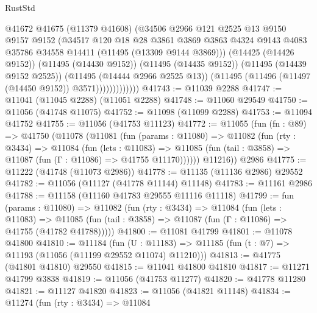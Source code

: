 \begin{lexlean}{RustStd}
\begin{coremodule}
                        @41672
                        @41675
                        (@11379 @41608)
                        (@34506
                          @2966
                          @121
                          @2525
                          @13
                          @9150
                          @9157
                          @9152
                          (@34517
                            @120
                            @18
                            @28
                            @3861
                            @3869
                            @3863
                            @4324
                            @9143
                            @4083
                            @35786
                            @34558
                            @14411
                            (@11495 (@13309 @9144 @3869)))
                          (@14425 (@14426 @9152))
                          (@11495 (@14430 @9152))
                          (@11495 (@14435 @9152))
                          (@11495 (@14439 @9152 @2525))
                          (@11495 (@14444 @2966 @2525 @13))
                          (@11495 (@11496 (@11497 (@14450 @9152)) @3571)))))))))))))
@41743 := @11039 @2288
@41747 := @11041 (@11045 @2288) (@11051 @2288)
@41748 := @11060 @29549
@41750 := @11056 (@41748 @11075)
@41752 := @11098 (@11099 @2288)
@41753 := @11094 @41752
@41755 := @11056 (@41753 @11123)
@41772 := @11055
    (fun (fn : @89) =>
    @41750
      (@11078
        (@11081
          (fun (params : @11080) =>
          @11082
            (fun (rty : @3434) =>
            @11084
              (fun (lets : @11083) =>
              @11085 (fun (tail : @3858) => @11087 (fun (Γ : @11086) => @41755 @11170))))))
        @11216))
    @2986
@41775 := @11222 (@41748 (@11073 @2986))
@41778 := @11135 (@11136 @2986) @29552
@41782 := @11056 (@11127 (@41778 @11144) @11148)
@41783 := @11161 @2986
@41788 := @11158 (@11160 @41783 @29555 @11116 @11118)
@41799 := fun (params : @11080) =>
  @11082
    (fun (rty : @3434) =>
    @11084
      (fun (lets : @11083) =>
      @11085 (fun (tail : @3858) => @11087 (fun (Γ : @11086) => @41755 (@41782 @41788)))))
@41800 := @11081 @41799
@41801 := @11078 @41800
@41810 := @11184
    (fun (U : @11183) => @11185 (fun (t : @7) => @11193 (@11056 (@11199 @29552 @11074) @11210)))
@41813 := @41775 (@41801 @41810) @29550
@41815 := @11041 @41800 @41810
@41817 := @11271 @41799 @3838
@41819 := @11056 (@41753 @11277)
@41820 := @41778 @11280
@41821 := @11127 @41820
@41823 := @11056 (@41821 @11148)
@41834 := @11274
    (fun (rty : @3434) =>
    @11084

\end{coremodule}
\end{lexlean}
